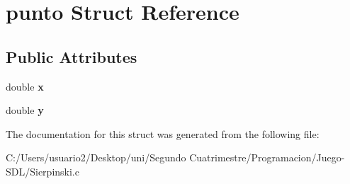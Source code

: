 \hypertarget{structpunto}{}\section{punto Struct Reference}
\label{structpunto}
\subsection*{Public Attributes}
\begin{DoxyCompactItemize}
\item 
double {\bfseries x}\hypertarget{structpunto_a58de8aa19104882e9f6aa7ea6d9b6916}{}\label{structpunto_a58de8aa19104882e9f6aa7ea6d9b6916}

\item 
double {\bfseries y}\hypertarget{structpunto_a31546c1c87e1567c70cb1a4c95abb311}{}\label{structpunto_a31546c1c87e1567c70cb1a4c95abb311}

\end{DoxyCompactItemize}


The documentation for this struct was generated from the following file\+:\begin{DoxyCompactItemize}
\item 
C\+:/\+Users/usuario2/\+Desktop/uni/\+Segundo Cuatrimestre/\+Programacion/\+Juego-\/\+S\+D\+L/Sierpinski.\+c\end{DoxyCompactItemize}
